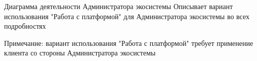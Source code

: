 Диаграмма деятельности Администратора экосистемы
Описывает вариант использования "Работа с платформой" для Администратора экосистемы во всех подробностях

Примечание: вариант использования "Работа с платформой" требует применение клиента со стороны Администратора экосистемы
